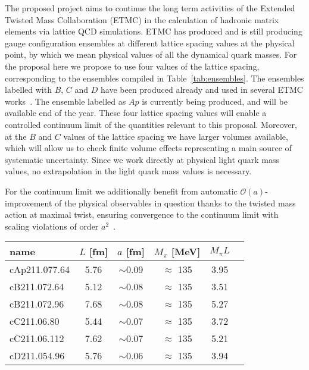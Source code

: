 
The proposed project aims to continue the long term activities of the
Extended Twisted Mass Collaboration (ETMC) in the calculation of
hadronic matrix elements via lattice QCD simulations. ETMC has
produced and is still producing gauge configuration ensembles at
different lattice spacing values at the physical point, by which we
mean physical values of all the dynamical quark masses. For the
proposal here we propose to use four values of the lattice spacing,
corresponding to the ensembles compiled in Table~\ref{tab:ensembles}. The
ensembles labelled with $B$, $C$ and $D$ have been produced already
and used in several ETMC
works~\cite{ExtendedTwistedMass:2021qui,ExtendedTwistedMass:2021gbo,ExtendedTwistedMass:2022jpw,ExtendedTwistedMassCollaborationETMC:2022sta}.
The ensemble labelled as $Ap$ is currently being produced, and
will be available end of the year.
These four lattice spacing values will enable a controlled continuum
limit of the quantities relevant to this proposal.
Moreover, at the $B$ and $C$ values of the lattice spacing we have
larger volumes available, which will allow us to check finite volume
effects representing a main source of systematic uncertainty.
Since we work directly at physical light quark mass values, no
extrapolation in the light quark mass values is necessary.

For the continuum limit we additionally benefit from automatic
$\mathcal{O}(a)$-improvement of the physical observables in question thanks to the twisted mass action at
maximal twist, ensuring convergence to the continuum
limit with scaling violations of order $a^2$~\cite{Frezzotti:2003ni}.

\begin{SCtable}[.4]
	\centering %
	\begin{tabular}{lccccr} %
		\toprule
		name & $L$ [fm] & $a$
		[fm] & $M_\pi$ [MeV]& $M_\pi L$ \\
				\midrule
		cAp211.077.64 & 5.76 & $\sim$0.09 & $\approx$ 135 & 3.95  \\
		\midrule
		cB211.072.64 & 5.12 & $\sim$0.08 & $\approx$ 135 & 3.51  \\
		cB211.072.96 & 7.68 & $\sim$0.08 & $\approx$ 135 & 5.27  \\
		\hline
		cC211.06.80  & 5.44 & $\sim$0.07 & $\approx$ 135 & 3.72  \\
		cC211.06.112  & 7.62 & $\sim$0.07 & $\approx$ 135 & 5.21  \\
		\hline
		cD211.054.96  & 5.76 & $\sim$0.06 & $\approx$ 135 & 3.94  \\
		\bottomrule		
	\end{tabular}
	\caption{ETMC's $N_f=2+1+1$ gauge ensembles relevant for this
		proposal. The time extent is always set to $T=2L$.}
	\label{tab:ensembles}
\end{SCtable}

